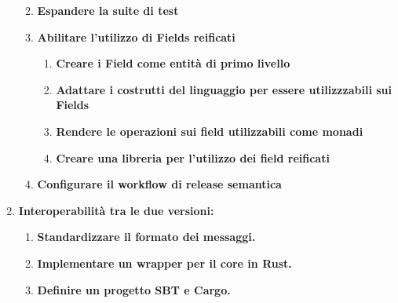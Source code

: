 \documentclass[12pt, a4paper]{article}
\begin{document}
\begin{enumerate}
\begin{enumerate}
\begin{enumerate}
                    \end{enumerate}
              \item \textbf{Espandere la suite di test}
                    \color{blue}
              \item \textbf{Abilitare l'utilizzo di Fields reificati}
                    \begin{enumerate}
                        \item \textbf{Creare i Field come entità di primo livello}
                        \item \textbf{Adattare i costrutti del linguaggio per essere utilizzzabili sui Fields}
                        \item \textbf{Rendere le operazioni sui field utilizzabili come monadi}
                        \item \textbf{Creare una libreria per l'utilizzo dei field reificati}
                    \end{enumerate}
              \item \textbf{Configurare il workflow di release semantica}

          \end{enumerate}

          \color{magenta}
    \item \textbf{Interoperabilità tra le due versioni:}
          \begin{enumerate}
              \item \textbf{Standardizzare il formato dei messaggi.}
              \item \textbf{Implementare un wrapper per il core in Rust.}
              \item \textbf{Definire un progetto SBT e Cargo.}
          \end{enumerate}
\end{enumerate}
\end{document}
